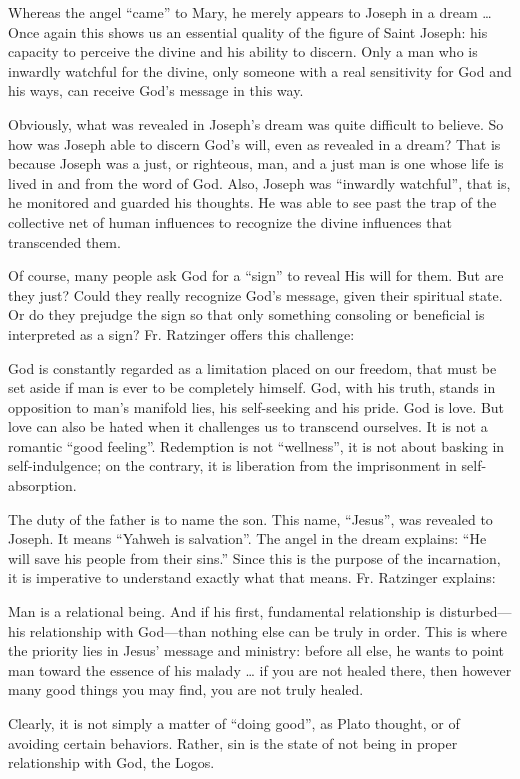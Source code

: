 \begin{quotex}
Whereas the angel “came” to Mary, he merely appears to Joseph in a dream … Once again this shows us an essential quality of the figure of Saint Joseph: his capacity to perceive the divine and his ability to discern. Only a man who is inwardly watchful for the divine, only someone with a real sensitivity for God and his ways, can receive God's message in this way. 

\end{quotex}
Obviously, what was revealed in Joseph's dream was quite difficult to believe. So how was Joseph able to discern God's will, even as revealed in a dream? That is because Joseph was a just, or righteous, man, and a just man is one whose life is lived in and from the word of God. Also, Joseph was “inwardly watchful”, that is, he monitored and guarded his thoughts. He was able to see past the trap of the collective net of human influences to recognize the divine influences that transcended them.

Of course, many people ask God for a “sign” to reveal His will for them. But are they just? Could they really recognize God's message, given their spiritual state. Or do they prejudge the sign so that only something consoling or beneficial is interpreted as a sign? Fr. Ratzinger offers this challenge:

\begin{quotex}
God is constantly regarded as a limitation placed on our freedom, that must be set aside if man is ever to be completely himself. God, with his truth, stands in opposition to man's manifold lies, his self-seeking and his pride. God is love. But love can also be hated when it challenges us to transcend ourselves. It is not a romantic “good feeling”. Redemption is not “wellness”, it is not about basking in self-indulgence; on the contrary, it is liberation from the imprisonment in self-absorption. 

\end{quotex}
The duty of the father is to name the son. This name, “Jesus”, was revealed to Joseph. It means “Yahweh is salvation”. The angel in the dream explains: “He will save his people from their sins.” Since this is the purpose of the incarnation, it is imperative to understand exactly what that means. Fr. Ratzinger explains:

\begin{quotex}
Man is a relational being. And if his first, fundamental relationship is disturbed—his relationship with God—than nothing else can be truly in order. This is where the priority lies in Jesus' message and ministry: before all else, he wants to point man toward the essence of his malady … if you are not healed there, then however many good things you may find, you are not truly healed. 

\end{quotex}
Clearly, it is not simply a matter of “doing good”, as Plato thought, or of avoiding certain behaviors. Rather, sin is the state of not being in proper relationship with God, the Logos.

